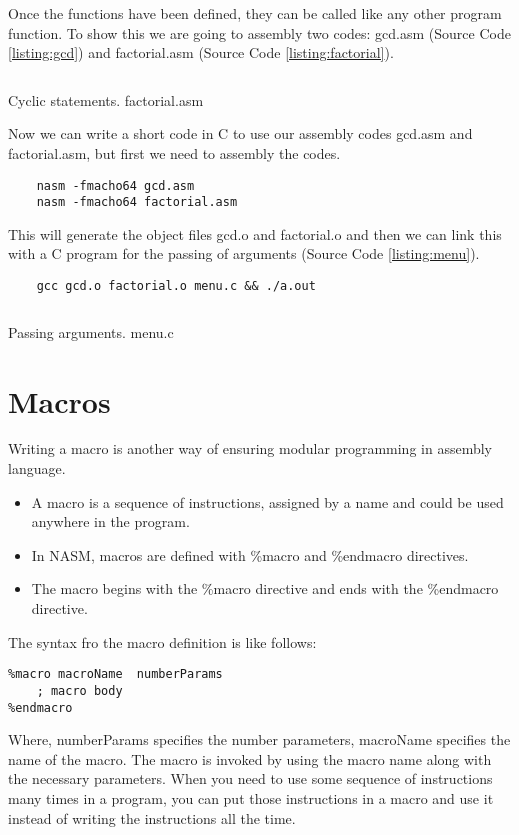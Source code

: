 Once the functions have been defined, they can be called like any other program function. To show this we are going to assembly two codes: gcd.asm (Source Code \ref{listing:gcd}) and factorial.asm (Source Code \ref{listing:factorial}).

\begin{listing}[H]
\inputminted{nasm}{code/factorial.asm}
\caption{Cyclic statements. factorial.asm}
\label{listing:factorial}
\end{listing}

Now we can write a short code in C to use our assembly codes gcd.asm and factorial.asm, but first we need to assembly the codes.

\begin{verbatim}
	nasm -fmacho64 gcd.asm
	nasm -fmacho64 factorial.asm
\end{verbatim}

This will generate the object files gcd.o and factorial.o and then we can link this with a C program for the passing of arguments (Source Code \ref{listing:menu}).

\begin{verbatim}
	gcc gcd.o factorial.o menu.c && ./a.out
\end{verbatim}

\newpage
\begin{listing}[H]
\inputminted{c}{code/menu.c}
\caption{Passing arguments. menu.c}
\label{listing:menu}
\end{listing}

\section{Macros}
Writing a macro is another way of ensuring modular programming in assembly language.
\begin{itemize}
\item A macro is a sequence of instructions, assigned by a name and could be used anywhere in the program.
\item In NASM, macros are defined with \%macro and \%endmacro directives.
\item The macro begins with the \%macro directive and ends with the \%endmacro directive.
\end{itemize}
The syntax fro the macro definition is like follows:
\begin{verbatim}
%macro macroName  numberParams
	; macro body
%endmacro
\end{verbatim}
Where, numberParams specifies the number parameters, macroName specifies the name of the macro. The macro is invoked by using the macro name along with the necessary parameters. When you need to use some sequence of instructions many times in a program, you can put those instructions in a macro and use it instead of writing the instructions all the time.

